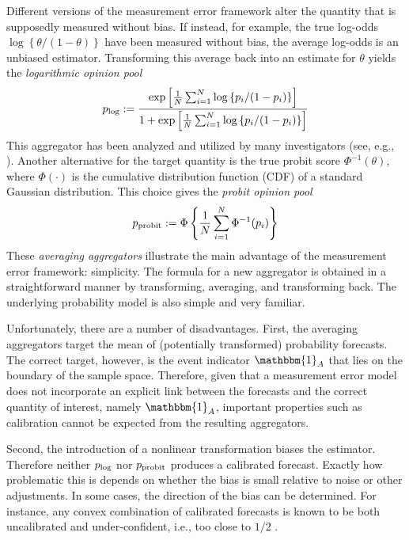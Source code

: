 \documentclass[12pt]{article}
\theoremstyle{definition}
\theoremstyle{definition}
\def\one{\mathbbm{1}}
\def\probit{p_{\rm probit}}
\def\plog{p_{\rm log}}
\begin{document}
Different versions of the measurement error framework alter the quantity that is supposedly
measured without bias. If instead, for example, the true log-odds
$\log\left\{\theta/(1-\theta)\right\}$ have been measured without
bias, the average log-odds is an unbiased estimator. Transforming
this average back into an estimate for $\theta$ yields the {\em
logarithmic opinion pool}
$$\plog := \frac{\exp \left [ \frac{1}{N} \sum_{i=1}^N
   \log \left\{ p_i / (1-p_i) \right\} \right ]} {1 + \exp \left [
\frac{1}{N} \sum_{i=1}^N \log \left\{p_i / (1-p_i)\right\} \right
]} $$ This aggregator has been analyzed and utilized by many
investigators (see, e.g., \citealt{dawid1995coherent, Genest,
bacharach1975group}). Another alternative for the target quantity is
the true probit score $\Phi^{-1}(\theta)$, where $\Phi(\cdot)$ is the
cumulative distribution function (CDF) of a standard Gaussian
distribution. This choice gives the {\em probit opinion pool}
$$\probit := \Phi \left\{ \frac{1}{N} \sum_{i=1}^N \Phi^{-1}
   (p_i) \right \} $$
These \textit{averaging aggregators} illustrate the main advantage of the measurement
error framework: simplicity.  The formula for a new aggregator is
obtained in a straightforward manner by transforming, averaging, and
transforming back.  The underlying probability model is also simple
and very familiar.  

Unfortunately, there are a number of disadvantages. First, the averaging aggregators target the mean of
(potentially transformed) probability forecasts. The correct target,
however, is the event indicator $\one_A$ that lies on the boundary of
the sample space. Therefore, given that a measurement error model does not incorporate an explicit link between the forecasts and the correct quantity of interest, namely $\one_A$, important properties such as calibration cannot be expected from the resulting aggregators. 


Second, the introduction of a nonlinear transformation biases the
estimator.  Therefore neither $\plog$ nor $\probit$ produces a
calibrated forecast. Exactly how problematic this is depends on
whether the bias is small relative to noise or other
adjustments. In some cases,  the direction of the bias can be determined. For instance, any convex
combination of calibrated forecasts is known to be both uncalibrated and under-confident, i.e., too close to $1/2$ \citep{Ranjan08}.
\end{document}
